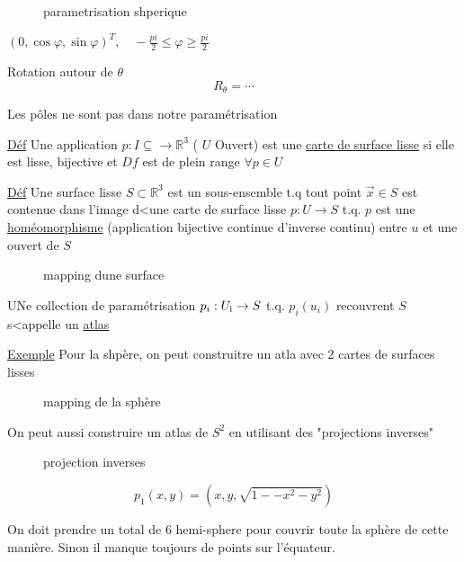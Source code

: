 \begin{figure}[h!]
    \centering
    \caption{parametrisation shperique}
    \label{fig:parametrisation-shperique}
\end{figure}
	
$(0, \cos\varphi,\sin\varphi)^T,\quad -\frac{pi}{2} \le \varphi \ge \frac{pi}{2} $ 

Rotation autour de $\theta$ $$R_\theta = \dotsb$$ 

Les pôles ne sont pas dans notre paramétrisation

\underline{Déf} Une application $p: I \subseteq \to \mathbb{R}^3$ ( $U$ Ouvert) est une \underline{carte de surface lisse} si elle est lisse, bijective et $Df$ est de plein range $\forall p \in U$

\underline{Déf} Une surface lisse $S \subset \mathbb{R}^3$ est un sous-ensemble t.q tout point $\vec x\in S$  est contenue dans l'image d<une carte de surface lisse $p:U\to S$ t.q. $p$ est une \underline{homéomorphisme} (application bijective continue d'inverse continu) entre $u$ et une ouvert de $S$    

\begin{figure}[h!]
    \centering
    \caption{mapping dune surface}
    \label{fig:mapping-dune-surface}
\end{figure}

UNe collection de paramétrisation $p_i: U_{\rm i}\to S$ t.q. $p_i(u_i)$ recouvrent $S$ s<appelle un \underline{atlas}    


\underline{Exemple} Pour la shpère, on peut construitre un atla avec 2 cartes de surfaces lisses 

\begin{figure}[h!]
    \centering
    \caption{mapping de la sphère}
    \label{fig:mapping-de-la-sphère}
\end{figure}

On peut aussi construire un atlas de $S^2$ en utilisant des "projections inverses"

\begin{figure}[h!]
    \centering
    \caption{projection inverses}
    \label{fig:projection-inverses}
\end{figure}


$$p_1(x,y) = (x,y,\sqrt{1--x^2-y^2})$$ 


On doit prendre un total de 6 hemi-sphere pour couvrir toute la sphère de cette manière. Sinon il manque toujours de points sur l'équateur.


